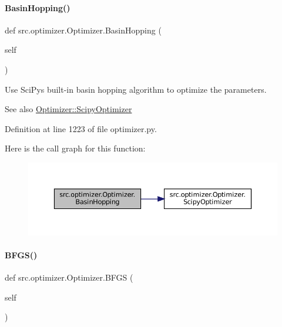 \paragraph{\texorpdfstring{Basin\+Hopping()}{BasinHopping()}}
{\footnotesize\ttfamily def src.\+optimizer.\+Optimizer.\+Basin\+Hopping (\begin{DoxyParamCaption}\item[{}]{self }\end{DoxyParamCaption})}



Use Sci\+Py\textquotesingle{}s built-\/in basin hopping algorithm to optimize the parameters. 

\begin{DoxySeeAlso}{See also}
\hyperlink{classsrc_1_1optimizer_1_1Optimizer_a1e616a4c920b3e8935ca19e208b1c3be}{Optimizer\+::\+Scipy\+Optimizer} 
\end{DoxySeeAlso}


Definition at line 1223 of file optimizer.\+py.

Here is the call graph for this function\+:
\nopagebreak
\begin{figure}[H]
\begin{center}
\leavevmode
\includegraphics[width=350pt]{classsrc_1_1optimizer_1_1Optimizer_a5ba1a8a4ea6dd488697e647b8aa2228a_cgraph}
\end{center}
\end{figure}
\mbox{\label{classsrc_1_1optimizer_1_1Optimizer_a8cdd2f557dca05f63ffd1893916fd4ca}} 
\paragraph{\texorpdfstring{B\+F\+G\+S()}{BFGS()}}
{\footnotesize\ttfamily def src.\+optimizer.\+Optimizer.\+B\+F\+GS (\begin{DoxyParamCaption}\item[{}]{self }\end{DoxyParamCaption})}



